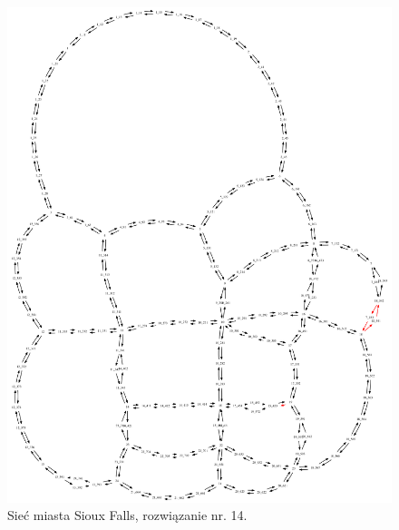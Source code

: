 \documentclass[twoside,12pt]{report}
\begin{document}
\begin{figure}[ht]
\centering
\includegraphics[totalheight=0.580\textheight, angle=90]{img/sioux-out/14/network2}
\caption{Sieć miasta Sioux Falls, rozwiązanie nr. 14.}
\label{sioux14}
\end{figure}
\end{document}

